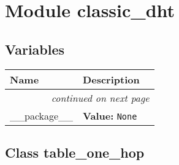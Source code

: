%
%
%


\section{Module classic\_dht}

    \label{classic_dht}


  \subsection{Variables}

    \vspace{-1cm}
\hspace{\varindent}\begin{longtable}{|p{\varnamewidth}|p{\vardescrwidth}|l}
\cline{1-2}
\cline{1-2} \centering \textbf{Name} & \centering \textbf{Description}& \\
\cline{1-2}
\endhead\cline{1-2}\multicolumn{3}{r}{\small\textit{continued on next page}}\\\endfoot\cline{1-2}
\endlastfoot\raggedright \_\-\_\-p\-a\-c\-k\-a\-g\-e\-\_\-\_\- & \raggedright \textbf{Value:} 
{\tt None}&\\
\cline{1-2}
\end{longtable}



\subsection{Class table\_one\_hop}

